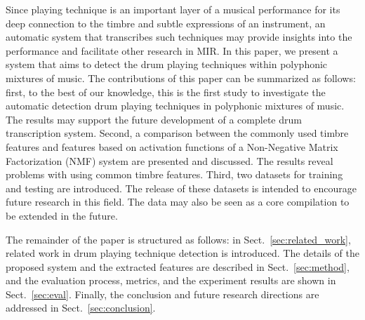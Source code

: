 \documentclass{article}
\begin{document}
Since playing technique is an important layer of a musical performance for its deep connection to the timbre and subtle expressions of an instrument, an automatic system that transcribes such techniques may provide insights into the performance and facilitate other research in MIR. In this paper, we present a system that aims to detect the drum playing techniques within polyphonic mixtures of music. 
The contributions of this paper can be summarized as follows: first, to the best of our knowledge, this is the first study to investigate the automatic detection drum playing techniques in polyphonic mixtures of music. The results may support the future development of a complete drum transcription system. Second, a comparison between the commonly used timbre features and features based on activation functions of a Non-Negative Matrix Factorization (NMF) system are presented and discussed. The results reveal problems with using common timbre features. Third, two datasets for training and testing are introduced. The release of these datasets is intended to encourage future research in this field. The data may also be seen as a core compilation to be extended in the future.

The remainder of the paper is structured as follows: in Sect.~\ref{sec:related_work}, related work in drum playing technique detection is introduced. The details of the proposed system and the extracted features are described in Sect.~\ref{sec:method}, and the evaluation process, metrics, and the experiment results are shown in Sect.~\ref{sec:eval}. Finally, the conclusion and future research directions are addressed in Sect.~\ref{sec:conclusion}. 


%
\end{document}
